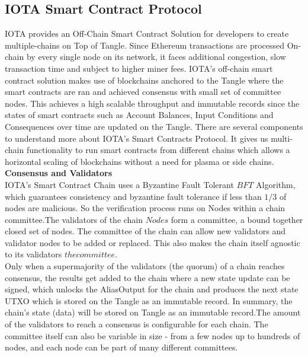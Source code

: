 \documentclass[conference]{IEEEtran}
\begin{document}
\subsection{\textbf{IOTA Smart Contract Protocol}}

IOTA provides an Off-Chain Smart Contract Solution for developers to create multiple-chains on Top of Tangle. Since Ethereum transactions are processed On-chain by every single node on its network, it faces additional congestion, slow transaction time and subject to higher miner fees. IOTA's off-chain smart contract solution makes use of blockchains anchored to the Tangle where the smart contracts are ran and achieved consensus with small set of committee nodes. This achieves a high scalable throughput and immutable records since the states of smart contracts such as Account Balances, Input Conditions and Consequences over time are updated on the Tangle. There are several components to understand more about IOTA's Smart Contracts Protocol. It gives us multi-chain functionality to run smart contracts from different chains which allows a horizontal scaling of blockchains without a need for plasma or side chains.\\

\textbf{Consensus and Validators}\\

IOTA's Smart Contract Chain uses a Byzantine Fault Tolerant \(BFT\) Algorithm, which guarantees consistency and byzantine fault tolerance if less than $1/3$ of nodes are malicious. So the verification process runs on Nodes within a chain committee.The validators of the chain \(Nodes\) form a committee, a bound together closed set of nodes. The committee of the chain can allow new validators and validator nodes to be added or replaced. This also makes the chain itself agnostic to its validators \(the committee\).\\

Only when a supermajority of the validators (the quorum) of a chain reaches consensus, the results get added to the chain where a new state update can be signed, which unlocks the AliasOutput for the chain and produces the next state UTXO which is stored on the Tangle as an immutable record. In summary, the chain's state (data) will be stored on Tangle as an immutable record.The amount of the validators to reach a consensus is configurable for each chain. The committee itself can also be variable in size - from a few nodes up to hundreds of nodes, and each node can be part of many different committees.\\
\end{document}
